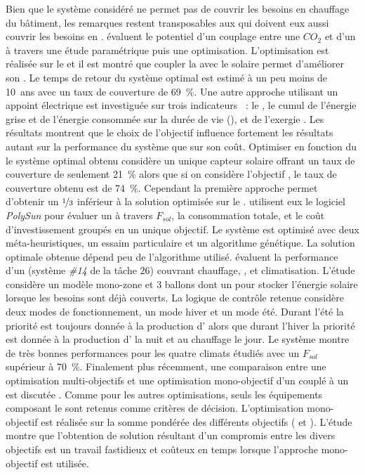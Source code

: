 Bien que le système considéré ne permet pas de couvrir les besoins en chauffage du
bâtiment, les remarques restent transposables aux  qui doivent eux aussi
couvrir les besoins en .
\textcite{Deng2013212} évaluent le potentiel d’un couplage entre une  $CO_{2}$ et
d’un  à travers une étude paramétrique puis une optimisation. L’optimisation est
réalisée sur le  et il est montré que coupler la  avec le
solaire permet d’améliorer son . Le temps de retour du système optimal est estimé
à un peu moins de \SI{10}{ans} avec un taux de couverture de \SI{69}{\percent}. Une autre
approche utilisant un appoint électrique est investiguée sur trois indicateurs
\parencite{Hin2012,Hin2014102}~:
le , le cumul de l’énergie grise et de l’énergie consommée sur la durée de vie
(), et de l’exergie . Les résultats montrent que le choix de l’objectif
influence fortement les résultats autant sur la performance du système que sur son coût.
Optimiser en fonction du  le système optimal obtenu considère un unique capteur
solaire offrant un taux de couverture de seulement \SI{21}{\percent} alors que si on
considère l’objectif , le taux de couverture obtenu est de \SI{74}{\percent}.
Cependant la première approche permet d’obtenir un  $\nicefrac{1}{3}$ inférieur à
la solution optimisée sur le . \textcite{Bornatico201231} utilisent eux le
logiciel \textit{PolySun} pour évaluer un  à travers $F_{sol}$, la
consommation totale, et le coût d’investissement groupés en un unique objectif. Le
système est optimisé avec deux méta-heuristiques, un essaim particulaire et un algorithme
génétique. La solution optimale obtenue dépend peu de l’algorithme utilisé.
\textcite{Asaee2014510} évaluent la performance d’un  (système \emph{\#14} de la tâche
$26$) couvrant chauffage, , et climatisation. L’étude considère un modèle
mono-zone et $3$ ballons dont un pour stocker l’énergie solaire lorsque les besoins sont déjà
couverts. La logique de contrôle retenue considère deux modes de fonctionnement, un mode
hiver et un mode été. Durant l’été la priorité est toujours donnée à la production
d’ alors que durant l’hiver la priorité est donnée à la production d’ la
nuit et au chauffage le jour. Le système montre de très bonnes performances pour les
quatre climats étudiés avec un $F_{sol}$ supérieur à \SI{70}{\percent}. Finalement
plus récemment, une comparaison entre une optimisation multi-objectifs et une optimisation
mono-objectif d’un  couplé à un  est discutée
\parencite{Rey2016622}. Comme pour les autres optimisations, seuls les équipements
composant le  sont retenus comme critères de décision. L’optimisation
mono-objectif est réalisée sur la somme pondérée des différents objectifs (
et ). L’étude montre que l’obtention de solution résultant d’un compromis entre
les divers objectifs est un travail fastidieux et coûteux en temps lorsque l’approche
mono-objectif est utilisée.


